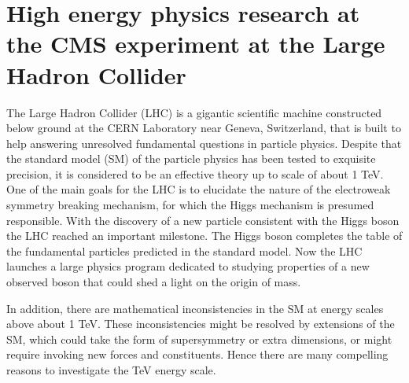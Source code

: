 \section{High energy physics research at the CMS 
     experiment at the Large Hadron Collider}


The Large Hadron Collider (LHC) is a gigantic scientific machine 
constructed 
below ground at the CERN Laboratory near Geneva, Switzerland, 
that is built to help answering unresolved fundamental questions in 
particle physics. 
Despite that the standard model (SM) of the particle physics has been 
tested 
to exquisite precision, it is considered to be an effective theory up to 
scale of about 1 TeV. 
One of the main goals for the LHC is to elucidate the nature of the 
electroweak symmetry
breaking mechanism, for which the Higgs mechanism is presumed responsible. 
With the discovery of a new particle consistent with the Higgs boson the 
LHC reached an important milestone.
The Higgs boson completes the table of the fundamental particles predicted
in the standard model. Now the LHC launches a large physics program 
dedicated 
to studying properties of a new observed boson that could shed a light on 
the origin
of mass.

In addition, there are mathematical inconsistencies in the SM at energy 
scales above about 1 TeV. These inconsistencies might be resolved by 
extensions of the SM, which could take the form 
of supersymmetry or extra dimensions, or might require invoking new forces 
and 
constituents. Hence there are many compelling reasons to investigate the 
TeV energy scale.


